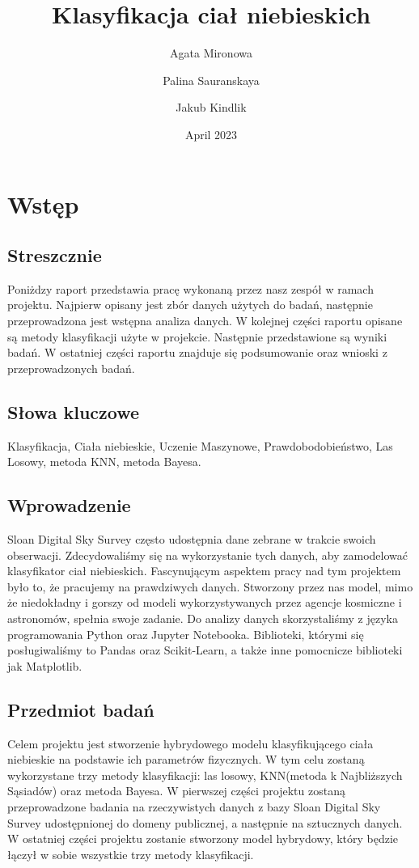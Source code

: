 \documentclass{article}
\title{Klasyfikacja ciał niebieskich}
\author{Agata Mironowa\and Palina Sauranskaya \and Jakub Kindlik }
\date{April 2023}
\begin{document}
\maketitle
\tableofcontents
\section{Wstęp}
\subsection{Streszcznie}
Poniżdzy raport przedstawia pracę wykonaną przez nasz zespół w ramach projektu. Najpierw opisany jest zbór danych użytych do badań, następnie przeprowadzona jest wstępna analiza danych. W kolejnej części raportu opisane są metody klasyfikacji użyte w projekcie. Następnie przedstawione są wyniki badań. W ostatniej części raportu znajduje się podsumowanie oraz wnioski z przeprowadzonych badań.
\subsection{Słowa kluczowe}
Klasyfikacja, Ciała niebieskie, Uczenie Maszynowe, Prawdobodobieństwo, Las Losowy, metoda KNN, metoda Bayesa.
\subsection{Wprowadzenie}
Sloan Digital Sky Survey często udostępnia dane zebrane w trakcie swoich obserwacji. Zdecydowaliśmy się na wykorzystanie tych danych, aby zamodelować klasyfikator ciał niebieskich. Fascynującym aspektem pracy nad tym projektem było to, że pracujemy na prawdziwych danych. Stworzony przez nas model, mimo że niedokładny i gorszy od modeli wykorzystywanych przez agencje kosmiczne i astronomów, spełnia swoje zadanie.\newline
Do analizy danych skorzystaliśmy z języka programowania Python oraz Jupyter Notebooka. Biblioteki, którymi się posługiwaliśmy to Pandas oraz Scikit-Learn, a także inne pomocnicze biblioteki jak Matplotlib.
\subsection{Przedmiot badań}
Celem projektu jest stworzenie hybrydowego modelu klasyfikującego ciała niebieskie na podstawie ich parametrów fizycznych.
W tym celu zostaną wykorzystane trzy metody klasyfikacji: las losowy, KNN(metoda k Najbliższych Sąsiadów) oraz metoda Bayesa.
W pierwszej części projektu zostaną przeprowadzone badania na rzeczywistych danych z bazy Sloan Digital Sky Survey
udostępnionej do domeny publicznej, a następnie na sztucznych danych.
W ostatniej części projektu zostanie stworzony model hybrydowy, który będzie łączył w sobie wszystkie trzy metody klasyfikacji.
\end{document}
